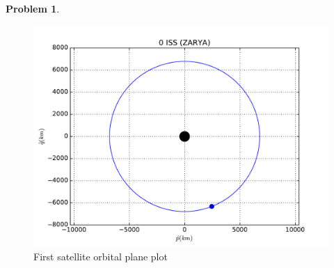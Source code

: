 \documentclass[10pt]{article}
\theoremstyle{definition}
\newtheorem{prob}{Problem}[section]
\begin{document}
\begin{prob}
\begin{figure}[htbp]
    \centering
    \includegraphics[width=\textwidth]{figures/25544.pdf}
    \caption{First satellite orbital plane plot\label{fig:iss}}
\end{figure}
\end{prob}
\end{document}
